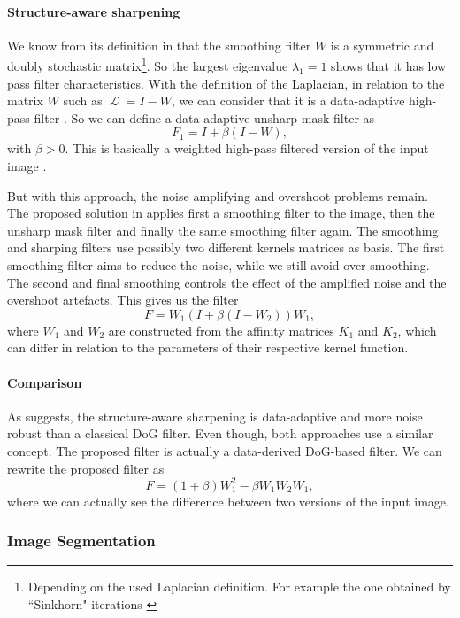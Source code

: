 \documentclass[]{article}
\DeclareMathOperator{\Lapl}{\mathcal{L}}
\begin{document}
\paragraph{Structure-aware sharpening}
We know from its definition in \cite{kheradmand_non-linear_2015} that the smoothing filter \(W\) is a symmetric and doubly stochastic matrix\footnote{Depending on the used Laplacian definition. For example the one obtained by ``Sinkhorn" iterations \cite{milanfar_symmetrizing_2013}}.
So the largest eigenvalue \(\lambda_1 = 1\) shows that it has low pass filter characteristics.
With the definition of the Laplacian, in relation to the matrix \(W\) such as \(\Lapl = I - W\), we can consider that it is a data-adaptive high-pass filter \cite{kheradmand_graph-based_2016}.
So we can define a data-adaptive unsharp mask filter as
\[F_1 = I + \beta (I-W),\]
with \(\beta > 0\). This is basically a weighted high-pass filtered version of the input image \cite{siam_slides_2016}.

But with this approach, the noise amplifying and overshoot problems remain.
The proposed solution in \cite{kheradmand_non-linear_2015} applies first a smoothing filter to the image, then the unsharp mask filter and finally the same smoothing filter again.
The smoothing and sharping filters use possibly two different kernels matrices as basis.
The first smoothing filter aims to reduce the noise, while we still avoid over-smoothing.
The second and final smoothing controls the effect of the amplified noise and the overshoot artefacts.
This gives us the filter
\[F = W_1(I + \beta (I - W_2))W_1,\]
where \(W_1\) and \(W_2\) are constructed from the affinity matrices \(K_1\) and \(K_2\), which can differ in relation to the parameters of their respective kernel function.

\paragraph{Comparison}
As \cite{kheradmand_non-linear_2015} suggests, the structure-aware sharpening is data-adaptive and more noise robust than a classical DoG filter.
Even though, both approaches use a similar concept.
The proposed filter is actually a data-derived DoG-based filter.
We can rewrite the proposed filter as
\[F = (1+\beta) W_1^2 - \beta W_1 W_2 W_1,\]
where we can actually see the difference between two versions of the input image.

\subsubsection{Image Segmentation}
\end{document}

